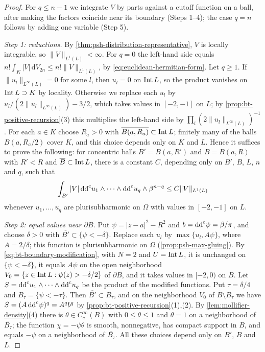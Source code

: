 \begin{proof}
For $q\le n-1$ we integrate $V$ by parts against a cutoff function on a ball, after making the factors coincide near its boundary (Steps 1--4); the case $q=n$ follows by adding one variable (Step 5).

\emph{Step 1: reductions.} By \cref{thm:psh-distribution-representative}, $V$ is locally integrable, so $\|V\|_{L^1(L)}<\infty$. For $q=0$ the left-hand side equals $n!\int_K|V|\,\mathrm{d}V_{2n}\le n!\|V\|_{L^1(L)}$, by \eqref{eq:euclidean-hermitian-form}. Let $q\ge1$. If $\|u_l\|_{L^\infty(L)}=0$ for some $l$, then $u_l=0$ on $\operatorname{Int} L$, so the product vanishes on $\operatorname{Int} L\supset K$ by locality. Otherwise we replace each $u_l$ by $u_l/(2\|u_l\|_{L^\infty(L)})-3/2$, which takes values in $[-2,-1]$ on $L$; by \cref{prop:bt-positive-recursion}(3) this multiplies the left-hand side by $\prod_l(2\|u_l\|_{L^\infty(L)})^{-1}$. For each $a\in K$ choose $R_a>0$ with $\overline{B(a,R_a)}\subset\operatorname{Int} L$; finitely many of the balls $B(a,R_a/2)$ cover $K$, and this choice depends only on $K$ and $L$. Hence it suffices to prove the following: for concentric balls $B'=B(a,R')$ and $B=B(a,R)$ with $R'<R$ and $\overline B\subset\operatorname{Int} L$, there is a constant $C$, depending only on $B'$, $B$, $L$, $n$ and $q$, such that
\[
 \int_{B'}|V|\,\mathrm{dd}^{\mathrm{c}} u_1\wedge\cdots\wedge\mathrm{dd}^{\mathrm{c}} u_q\wedge\beta^{n-q}\le C\|V\|_{L^1(L)}
\]
whenever $u_1,\ldots,u_q$ are plurisubharmonic on $\Omega$ with values in $[-2,-1]$ on $L$.

\emph{Step 2: equal values near $\partial B$.} Put $\psi=|z-a|^2-R^2$ and $b=\mathrm{dd}^{\mathrm{c}}\psi=\beta/\pi$, and choose $\delta>0$ with $\overline{B'}\subset\{\psi<-\delta\}$. Replace each $u_l$ by $\max\{u_l,A\psi\}$, where $A=2/\delta$; this function is plurisubharmonic on $\Omega$ (\cref{prop:psh-max-gluing}). By \eqref{eq:bt-boundary-modification}, with $N=2$ and $U=\operatorname{Int} L$, it is unchanged on $\{\psi<-\delta\}$, it equals $A\psi$ on the open neighborhood $V_0=\{z\in\operatorname{Int} L:\psi(z)>-\delta/2\}$ of $\partial B$, and it takes values in $[-2,0)$ on $B$. Let $S=\mathrm{dd}^{\mathrm{c}} u_1\wedge\cdots\wedge\mathrm{dd}^{\mathrm{c}} u_q$ be the product of the modified functions. Put $\tau=\delta/4$ and $B_\tau=\{\psi<-\tau\}$. Then $\overline{B'}\subset B_\tau$, and on the neighborhood $V_0$ of $\overline B\setminus B_\tau$ we have $S=(A\,\mathrm{dd}^{\mathrm{c}}\psi)^q=A^qb^q$ by \cref{prop:bt-positive-recursion}(1),(2). By \cref{lem:mollifier-density}(4) there is $\theta\in C^\infty_c(B)$ with $0\le\theta\le1$ and $\theta=1$ on a neighborhood of $\overline{B_\tau}$; the function $\chi=-\psi\theta$ is smooth, nonnegative, has compact support in $B$, and equals $-\psi$ on a neighborhood of $\overline{B_\tau}$. All these choices depend only on $B'$, $B$ and $L$.


\end{proof}
